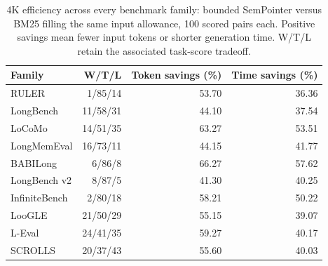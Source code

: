 \begin{table}[htbp]
\centering
\small
\setlength{\tabcolsep}{4pt}
\caption{4K efficiency across every benchmark family: bounded SemPointer versus BM25 filling the same input allowance, 100 scored pairs each. Positive savings mean fewer input tokens or shorter generation time. W/T/L retain the associated task-score tradeoff.}
\label{tab:family-efficiency}
\begin{tabular}{lrrr}
\toprule
Family & W/T/L & Token savings (\%) & Time savings (\%) \\
\midrule
RULER & 1/85/14 & 53.70 & 36.36 \\
LongBench & 11/58/31 & 44.10 & 37.54 \\
LoCoMo & 14/51/35 & 63.27 & 53.51 \\
LongMemEval & 16/73/11 & 44.15 & 41.77 \\
BABILong & 6/86/8 & 66.27 & 57.62 \\
LongBench v2 & 8/87/5 & 41.30 & 40.25 \\
InfiniteBench & 2/80/18 & 58.21 & 50.22 \\
LooGLE & 21/50/29 & 55.15 & 39.07 \\
L-Eval & 24/41/35 & 59.27 & 40.17 \\
SCROLLS & 20/37/43 & 55.60 & 40.03 \\
\bottomrule
\end{tabular}
\end{table}
